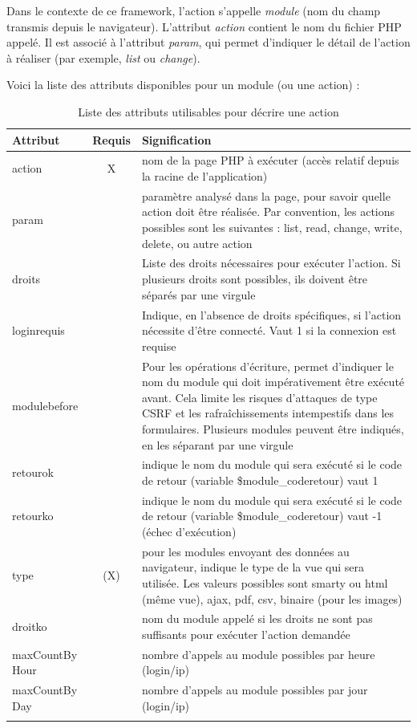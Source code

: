 Dans le contexte de ce framework, l'action s'appelle \textit{module} (nom du champ transmis depuis le navigateur). L'attribut \textit{action} contient le nom du fichier PHP appelé. Il est associé à l'attribut \textit{param}, qui permet d'indiquer le détail de l'action à réaliser (par exemple, \textit{list} ou \textit{change}).

Voici la liste des attributs disponibles pour un module (ou une action) :
\begin{longtable}{|p{2.5cm}|c|p{9cm}|}
\hline
\textbf{Attribut} & \textbf{Requis} & \textbf{Signification} \\
\hline
\endhead
action & X & nom de la page PHP à exécuter (accès relatif depuis la racine de l'application) \\

param &  & paramètre analysé dans la page, pour savoir quelle action doit être réalisée. Par convention, les actions possibles sont les suivantes : list, read, change, write, delete, ou autre action \\

droits &  & Liste des droits nécessaires pour exécuter l'action. Si plusieurs droits sont possibles, ils doivent être séparés par une virgule\\

loginrequis & & Indique, en l'absence de droits spécifiques, si l'action nécessite d'être connecté. Vaut 1 si la connexion est requise\\

modulebefore & & Pour les opérations d'écriture, permet d'indiquer le nom du module qui doit impérativement être exécuté avant. Cela limite les risques d'attaques de type CSRF et les rafraîchissements intempestifs dans les formulaires. Plusieurs modules peuvent être indiqués, en les séparant par une virgule\\

retourok & & indique le nom du module qui sera exécuté si le code de retour (variable \$module\_coderetour) vaut 1 \\

retourko & & indique le nom du module qui sera exécuté si le code de retour (variable \$module\_coderetour) vaut -1 (échec d'exécution) \\

type & (X) & pour les modules envoyant des données au navigateur, indique le type de la vue qui sera utilisée. Les valeurs possibles sont smarty ou html (même vue), ajax, pdf, csv, binaire (pour les images)  \\

droitko & & nom du module appelé si les droits ne sont pas suffisants pour exécuter l'action demandée \\

maxCountBy Hour & & nombre d'appels au module possibles par heure (login/ip) \\
maxCountBy Day & & nombre d'appels au module possibles par jour (login/ip) \\
\hline 
 
 \caption{Liste des attributs utilisables pour décrire une action}\label{actions}
\end{longtable}

